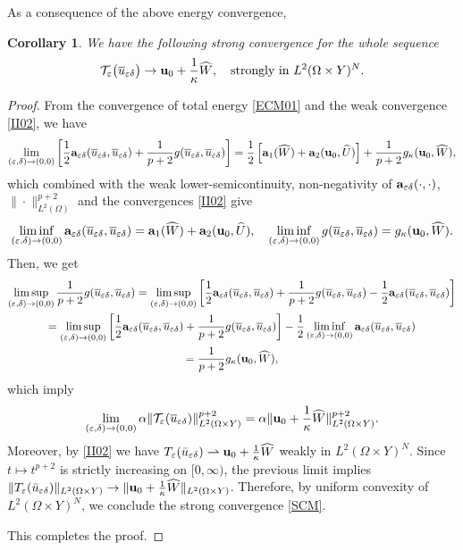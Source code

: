 \documentclass[11pt,a4paper]{article}
\numberwithin{equation}{section}
\def\wo{\overline}
\def\O{\Omega}
\def\d{\delta}
\def\e{\varepsilon}
\def\Te{{\cal T}_\varepsilon}
\def\a{{\alpha}}
\def\Ga{{\bf a}}
\def\ed{{\varepsilon\delta}}
\def\wh{\widehat }
\def\X{\times }
\def\Ga{{\bf a}}
\def\Gu{{\bf u}}
\newtheorem{corollary}[theorem]{Corollary}
\begin{document}
As a consequence of the above energy convergence, 
\begin{corollary}\label{Cor1}
	We have the following strong convergence for the whole sequence
	\begin{equation}\label{SCM}
		\Te\big(\wo u_\ed\big) \to \Gu_0+{1\over \kappa}\wh W,\quad\text{strongly in $L^2(\O\X Y)^{N}$}.
	\end{equation}
\end{corollary}
\begin{proof}
	
	From the convergence of total energy \eqref{ECM01} and the weak convergence \eqref{II02}, we have
	$$\lim_{(\e,\d)\to(0,0)}\left[{1\over 2}\Ga_\ed(\wo u_\ed,\wo u_\ed)+{1\over p+2}g(\wo{u}_\ed,\wo u_\ed)\right]={1\over 2}\left[\Ga_1(\wh W)+\Ga_2(\Gu_0,\wh U)\right]+{1\over p+2}g_\kappa(\Gu_0,\wh W),$$
	which combined with the weak lower-semicontinuity, non-negativity of $\Ga_\ed(\cdot,\cdot)$, $\|\cdot\|^{p+2}_{L^2(\O)}$ and the convergences \eqref{II02} give
	$$\liminf_{(\e,\d)\to(0,0)}\Ga_\ed(\wo u_\ed,\wo u_\ed)=\Ga_1(\wh W)+\Ga_2(\Gu_0,\wh U),\quad \liminf_{(\e,\d)\to(0,0)}g(\wo{u}_\ed,\wo u_\ed)=g_\kappa(\Gu_0,\wh W).$$
	Then, we get
	\begin{multline*}
		\limsup_{(\e,\d)\to(0,0)}{1\over p+2}g(\wo u_\ed,\wo u_\ed)=\limsup_{(\e,\d)\to(0,0)}\left[{1\over 2}\Ga_\ed(\wo u_\ed,\wo u_\ed)+{1\over p+2}g(\wo{u}_\ed,\wo u_\ed)-{1\over 2}\Ga_\ed(\wo u_\ed,\wo u_\ed)\right]\\
		=\limsup_{(\e,\d)\to(0,0)}\left[{1\over 2}\Ga_\ed(\wo u_\ed,\wo u_\ed)+{1\over p+2}g(\wo{u}_\ed,\wo u_\ed)\right]-{1\over 2}\liminf_{(\e,\d)\to(0,0)}\Ga_\ed(\wo u_\ed,\wo u_\ed)\\
		={1\over p+2}g_\kappa(\Gu_0,\wh W),
	\end{multline*}
	which imply
	$$\lim_{(\e,\d)\to(0,0)}\a\|\Te(\wo u_\ed)\|^{p+2}_{L^2(\O\X Y)}=\a\|\Gu_0+{1\over\kappa}\wh W\|^{p+2}_{L^2(\O\X Y)}.$$
Moreover, by \eqref{II02} we have
$T_\e(\bar u_{\e\delta}) \rightharpoonup \Gu_0+\frac1\kappa \wh W$ weakly in $L^2(\Omega\times Y)^N$.
Since $t\mapsto t^{p+2}$ is strictly increasing on $[0,\infty)$, the previous limit implies
$\|T_\e(\bar u_{\e\delta})\|_{L^2(\Omega\times Y)}\to \|\Gu_0+\frac1\kappa \wh W\|_{L^2(\Omega\times Y)}$.
Therefore, by uniform convexity of $L^2(\Omega\times Y)^N$, we conclude the strong convergence \eqref{SCM}.

	This completes the proof.
\end{proof}
\end{document}
